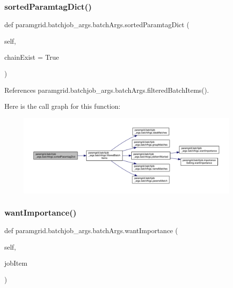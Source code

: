 \subsubsection{\texorpdfstring{sorted\+Paramtag\+Dict()}{sortedParamtagDict()}}
{\footnotesize\ttfamily def paramgrid.\+batchjob\+\_\+args.\+batch\+Args.\+sorted\+Paramtag\+Dict (\begin{DoxyParamCaption}\item[{}]{self,  }\item[{}]{chain\+Exist = {\ttfamily True} }\end{DoxyParamCaption})}



References paramgrid.\+batchjob\+\_\+args.\+batch\+Args.\+filtered\+Batch\+Items().

Here is the call graph for this function\+:
\nopagebreak
\begin{figure}[H]
\begin{center}
\leavevmode
\includegraphics[width=350pt]{classparamgrid_1_1batchjob__args_1_1batchArgs_a50b0de280c5e65044725927a0e174d3f_cgraph}
\end{center}
\end{figure}
\mbox{\label{classparamgrid_1_1batchjob__args_1_1batchArgs_ae80716e61fbcf0943666ca8400b6cfa2}} 
\subsubsection{\texorpdfstring{want\+Importance()}{wantImportance()}}
{\footnotesize\ttfamily def paramgrid.\+batchjob\+\_\+args.\+batch\+Args.\+want\+Importance (\begin{DoxyParamCaption}\item[{}]{self,  }\item[{}]{job\+Item }\end{DoxyParamCaption})}



